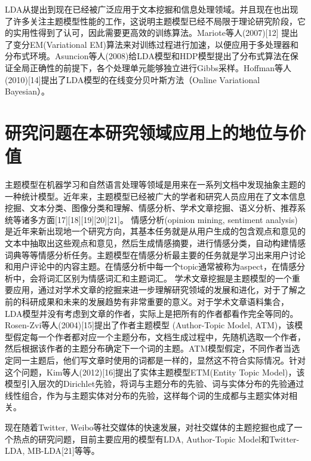 LDA从提出到现在已经被广泛应用于文本挖掘和信息处理领域。并且现在也出现了许多关注主题模型性能的工作，这说明主题模型已经不局限于理论研究阶段，它的实用性得到了认可，因此需要更高效的训练算法。Mariote等人(2007)[12] 提出了变分EM(Variational EM)算法来对训练过程进行加速，以便应用于多处理器和分布式环境。Asuncion等人(2008)给LDA模型和HDP模型提出了分布式算法在保证全局正确性的前提下，各个处理单元能够独立进行Gibbs采样。Hoffman等人(2010)[14]提出了LDA模型的在线变分贝叶斯方法（Online Variational Bayesian）。
\section{研究问题在本研究领域应用上的地位与价值}
主题模型在机器学习和自然语言处理等领域是用来在一系列文档中发现抽象主题的一种统计模型。近年来，主题模型已经被广大的学者和研究人员应用在了文本信息挖掘、文本分类、图像分类和理解、情感分析、学术文章挖掘、语义分析、推荐系统等诸多方面[17][18][19][20][21]。
情感分析(opinion mining,  sentiment analysis)是近年来新出现地一个研究方向，其基本任务就是从用户生成的包含观点和意见的文本中抽取出这些观点和意见，然后生成情感摘要，进行情感分类，自动构建情感词典等等情感分析任务。主题模型在情感分析最主要的任务就是学习出来用户讨论和用户评论中的内容主题。在情感分析中每一个topic通常被称为aspect，在情感分析中，会将词汇区别为情感词汇和主题词汇。
学术文章挖掘是主题模型的一个重要应用，通过对学术文章的挖掘来进一步理解研究领域的发展和进化，对于了解之前的科研成果和未来的发展趋势有非常重要的意义。对于学术文章语料集合，LDA模型并没有考虑到文章的作者，实际上是把所有的作者都看作完全等同的。Rosen-Zvi等人(2004)[15]提出了作者主题模型 (Author-Topic Model, ATM)，该模型假定每一个作者都对应一个主题分布，文档生成过程中，先随机选取一个作者，然后根据该作者的主题分布确定下一个词的主题。ATM模型假定，不同作者当选定同一主题后，他们写文章时使用的词都是一样的，显然这不符合实际情况。针对这个问题，Kim等人(2012)[16]提出了实体主题模型ETM(Entity Topic Model)，该模型引入层次的Dirichlet先验，将词与主题分布的先验、词与实体分布的先验通过线性组合，作为与主题实体对分布的先验，这样每个词的生成都与主题实体对相关。


现在随着Twitter, Weibo等社交媒体的快速发展，对社交媒体的主题挖掘也成了一个热点的研究问题，目前主要应用的模型有LDA, Author-Topic Model和Twitter-LDA, MB-LDA[21]等等。